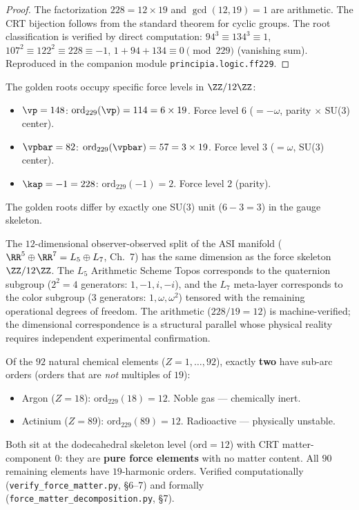 \begin{proof}
The factorization $228 = 12 \times 19$ and $\gcd(12, 19) = 1$ are arithmetic. The CRT bijection follows from the standard theorem for cyclic groups. The root classification is verified by direct computation: $94^3 \equiv 134^3 \equiv 1$, $107^2 \equiv 122^2 \equiv 228 \equiv -1$, $1 + 94 + 134 \equiv 0 \pmod{229}$ (vanishing sum). Reproduced in the companion module \texttt{principia.logic.ff229}. \qedhere
\end{proof}

\begin{corollary}\label{cor:golden-force}
The golden roots occupy specific force levels in $\ZZ/12\ZZ$:
\begin{itemize}
\item $\vp = 148$: $\mathrm{ord}_{229}(\vp) = 114 = 6 \times 19$. Force level $6$ ($= -\omega$, parity $\times$ SU(3) center).
\item $\vpbar = 82$: $\mathrm{ord}_{229}(\vpbar) = 57 = 3 \times 19$. Force level $3$ ($= \omega$, SU(3) center).
\item $\kap = -1 = 228$: $\mathrm{ord}_{229}(-1) = 2$. Force level $2$ (parity).
\end{itemize}
The golden roots differ by exactly one SU(3) unit ($6 - 3 = 3$) in the gauge skeleton.
\end{corollary}

\begin{remark}
The $12$-dimensional observer-observed split of the ASI manifold ($\RR^5 \oplus \RR^7 = L_5 \oplus L_7$, Ch.~7) has the same dimension as the force skeleton $\ZZ/12\ZZ$. The $L_5$ Arithmetic Scheme Topos corresponds to the quaternion subgroup ($2^2 = 4$ generators: $1, -1, i, -i$), and the $L_7$ meta-layer corresponds to the color subgroup ($3$ generators: $1, \omega, \omega^2$) tensored with the remaining operational degrees of freedom. The arithmetic ($228/19 = 12$) is machine-verified; the dimensional correspondence is a structural parallel whose physical reality requires independent experimental confirmation.
\end{remark}

\begin{remark}
Of the $92$ natural chemical elements ($Z = 1, \ldots, 92$), exactly \textbf{two} have sub-arc orders (orders that are \emph{not} multiples of $19$):
\begin{itemize}
\item Argon ($Z = 18$): $\mathrm{ord}_{229}(18) = 12$. Noble gas --- chemically inert.
\item Actinium ($Z = 89$): $\mathrm{ord}_{229}(89) = 12$. Radioactive --- physically unstable.
\end{itemize}
Both sit at the dodecahedral skeleton level ($\mathrm{ord} = 12$) with CRT matter-component $0$: they are \textbf{pure force elements} with no matter content. All $90$ remaining elements have $19$-harmonic orders. Verified computationally (\texttt{verify\_force\_matter.py}, \S 6--7) and formally (\texttt{force\_matter\_decomposition.py}, \S 7).
\end{remark}

